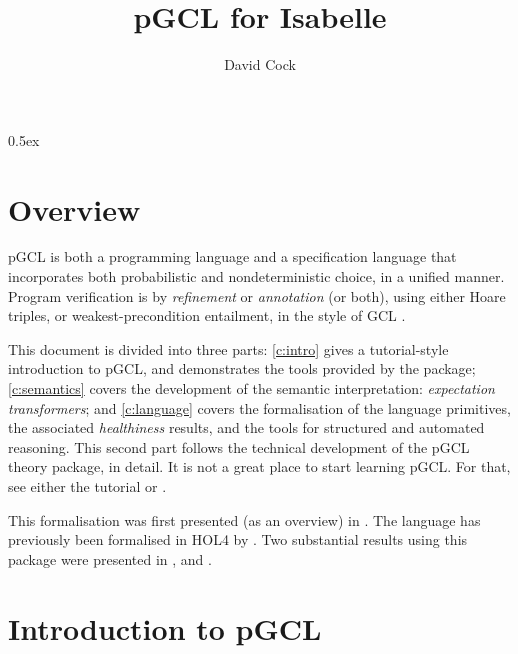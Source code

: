 \documentclass[11pt,a4paper]{book}
\begin{document}
\renewcommand{\chapterautorefname}{Chapter}
\renewcommand{\sectionautorefname}{Section}
\renewcommand{\subsectionautorefname}{Section}
\renewcommand{\subsubsectionautorefname}{Section}
\renewcommand{\appendixautorefname}{Appendix}
\renewcommand{\Hfootnoteautorefname}{Footnote}
\newcommand{\lemmaautorefname}{Lemma}
\newcommand{\definitionautorefname}{Definition}

\frontmatter

\title{pGCL for Isabelle}
\author{David Cock}
\maketitle

\tableofcontents

\parindent 0pt\parskip 0.5ex

\mainmatter

\chapter{Overview}

pGCL is both a programming language and a specification language that
incorporates both probabilistic and nondeterministic choice, in a unified
manner.  Program verification is by \emph{refinement} or \emph{annotation} (or
both), using either Hoare triples, or weakest-precondition entailment, in the
style of GCL \citep{Dijkstra_75}.

This document is divided into three parts: \autoref{c:intro} gives a
tutorial-style introduction to pGCL, and demonstrates the tools provided by
the package; \autoref{c:semantics} covers the development of the semantic
interpretation: \emph{expectation transformers}; and \autoref{c:language}
covers the formalisation of the language primitives, the associated
\emph{healthiness} results, and the tools for structured and automated
reasoning.  This second part follows the technical development of the pGCL
theory package, in detail.  It is not a great place to start learning pGCL.
For that, see either the tutorial or \citet{McIver_M_04}.

This formalisation was first presented (as an overview) in \citet{Cock_12}.
The language has previously been formalised in HOL4 by \citet{Hurd_05}.  Two
substantial results using this package were presented in \citet{Cock_13},
\citet{Cock_14} and \citet{Cock_14a}.

\chapter{Introduction to pGCL}
\label{c:intro}



\end{document}
